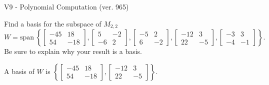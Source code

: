 \begin{exercise}
  \begin{exerciseTitle}V9 - Polynomial Computation (ver. 965)\end{exerciseTitle}
  \begin{exerciseStatement}
    Find a basis for the subspace of \(M_{2,2}\) 
\[W=\mathrm{span}\ \left\{\left[\begin{array}{cc}
-45 & 18 \\
54 & -18
\end{array}\right] , \left[\begin{array}{cc}
5 & -2 \\
-6 & 2
\end{array}\right] , \left[\begin{array}{cc}
-5 & 2 \\
6 & -2
\end{array}\right] , \left[\begin{array}{cc}
-12 & 3 \\
22 & -5
\end{array}\right] , \left[\begin{array}{cc}
-3 & 3 \\
-4 & -1
\end{array}\right]\right\}.\]
 Be sure to explain why your result is a basis.


  \end{exerciseStatement}
  \begin{exerciseAnswer}
   A basis of \(W\) is  \(\left\{\left[\begin{array}{cc}
-45 & 18 \\
54 & -18
\end{array}\right] , \left[\begin{array}{cc}
-12 & 3 \\
22 & -5
\end{array}\right]\right\}\).
  


  \end{exerciseAnswer}
\end{exercise}